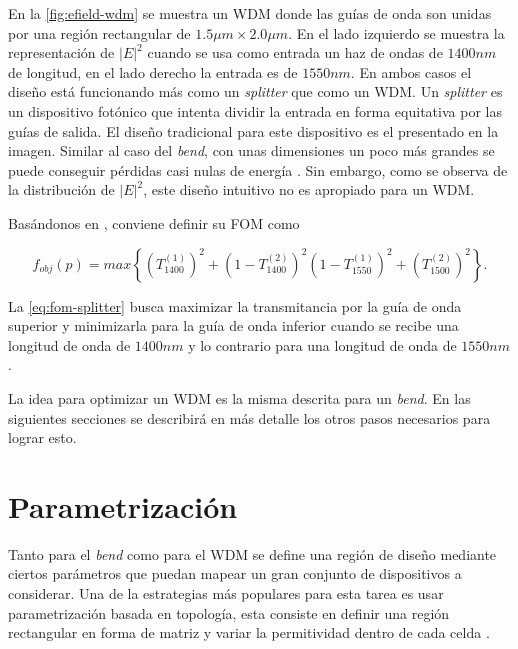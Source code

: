 En la \autoref{fig:efield-wdm} se muestra un WDM donde las guías de onda son unidas por una región rectangular
de $1.5\mu m \times 2.0 \mu m$. En el lado izquierdo se muestra la representación de $|E|^2$ cuando se usa 
como entrada un haz de ondas de $1400 nm$ de longitud, en el lado derecho la entrada es de $1550 nm$.
En ambos casos el diseño está funcionando más como un \emph{splitter} que como un WDM.
Un \emph{splitter} es un dispositivo fotónico que intenta dividir la entrada en forma equitativa por las guías
de salida. El diseño tradicional para este dispositivo es el presentado en la imagen. Similar al caso del
\emph{bend}, con unas dimensiones un poco más grandes se puede conseguir pérdidas casi nulas de energía
\citep{LukasChrostowski2010}.
Sin embargo, como se observa de la distribución de $|E|^2$, este diseño intuitivo no es apropiado para un WDM.

Basándonos en \cite{Su2020}, conviene definir su FOM como

\begin{equation}
  f_{obj}(p) = max \left \{ \left ( T_{1400}^{(1)} \right )^2  + 
                            \left ( 1 - T_{1400}^{(2)} \right )^2
                            \left ( 1 - T_{1550}^{(1)} \right )^2  + 
                            \left ( T_{1500}^{(2)} \right )^2 
                    \right \}.
\label{eq:fom-splitter}
\end{equation}

La \autoref{eq:fom-splitter} busca maximizar la transmitancia por la guía de onda superior y minimizarla para la guía de onda inferior cuando se recibe una longitud de onda de $1400 nm$ y lo contrario para una longitud de onda de $1550 nm$.

La idea para optimizar un WDM es la misma descrita para un \emph{bend}. En las siguientes secciones se
describirá en más detalle los otros pasos necesarios para lograr esto.

\section{Parametrización}\label{sec:parametrization}

Tanto para el \emph{bend} como para el WDM se define una región de diseño
mediante ciertos parámetros que puedan mapear un gran conjunto de dispositivos a considerar.
Una de la estrategias más populares para esta tarea es usar parametrización
basada en topología, esta consiste en definir una región rectangular en forma
de matriz y variar la permitividad dentro de cada celda \citep{Molesky2018}.

